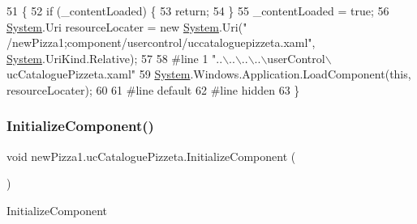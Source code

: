 \begin{DoxyCode}
51                                           \{
52             \textcolor{keywordflow}{if} (\_contentLoaded) \{
53                 \textcolor{keywordflow}{return};
54             \}
55             \_contentLoaded = \textcolor{keyword}{true};
56             \hyperlink{namespaceSystem}{System}.Uri resourceLocater = \textcolor{keyword}{new} \hyperlink{namespaceSystem}{System}.Uri(\textcolor{stringliteral}{"
      /newPizza1;component/usercontrol/uccataloguepizzeta.xaml"}, \hyperlink{namespaceSystem}{System}.UriKind.Relative);
57             
58 \textcolor{preprocessor}{            #line 1 "..\(\backslash\)..\(\backslash\)..\(\backslash\)..\(\backslash\)userControl\(\backslash\)ucCataloguePizzeta.xaml"
}
59             \hyperlink{namespaceSystem}{System}.Windows.Application.LoadComponent(\textcolor{keyword}{this}, resourceLocater);
60             
61 \textcolor{preprocessor}{            #line default
}
62 \textcolor{preprocessor}{            #line hidden
}
63         \}
\end{DoxyCode}
\mbox{\label{classnewPizza1_1_1ucCataloguePizzeta_afdbc12c0fdebf3e506da6fe56e30af7b}} 
\subsubsection{\texorpdfstring{Initialize\+Component()}{InitializeComponent()}\hspace{0.1cm}{\footnotesize\ttfamily [4/6]}}
{\footnotesize\ttfamily void new\+Pizza1.\+uc\+Catalogue\+Pizzeta.\+Initialize\+Component (\begin{DoxyParamCaption}{ }\end{DoxyParamCaption})\hspace{0.3cm}{\ttfamily [inline]}}



Initialize\+Component 



